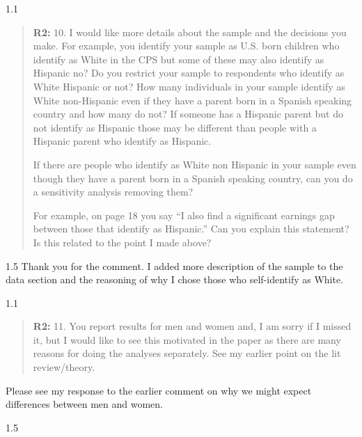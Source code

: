 \documentclass[12pt,english]{article}
\newcommand{\rrquote}{1.1}
\newcommand{\rrxspc}{1.5}
\begin{document}
\begin{refsection}
    \begin{spacing}{\rrquote}
        \begin{quotation}
        \textbf{R2: } 10. I would like more details about the sample and the decisions you make. For example, you identify your sample as U.S. born children who identify as White in the CPS but some of these may also identify as Hispanic no? Do you restrict your sample to respondents who identify as White Hispanic or not? How many individuals in your sample identify as White non-Hispanic even if they have a parent born in a Spanish speaking country and how many do not? If someone has a Hispanic parent but do not identify as Hispanic those may be different than people with a Hispanic parent who identify as Hispanic.
        
        If there are people who identify as White non Hispanic in your sample even though they have a parent born in a Spanish speaking country, can you do a sensitivity analysis removing them?

        For example, on page 18 you say “I also find a significant earnings gap between those that identify as Hispanic.” Can you explain this statement? Is this related to the point I made above?

        \end{quotation}
        \end{spacing}
        
        \begin{spacing}{\rrxspc}
            Thank you for the comment. I added more description of the sample to the data section and the reasoning of why I chose those who self-identify as White. 
    \end{spacing}

    \begin{spacing}{\rrquote}
        \begin{quotation}
        \textbf{R2: } 11. You report results for men and women and, I am sorry if I missed it, but I would like to see this motivated in the paper as there are many reasons for doing the analyses separately. See my earlier point on the lit review/theory.
              
        \end{quotation}
        \end{spacing}
            Please see my response to the earlier comment on why we might expect differences between men and women.
        \begin{spacing}{\rrxspc}
            

\end{spacing}
\end{refsection}
\end{document}
